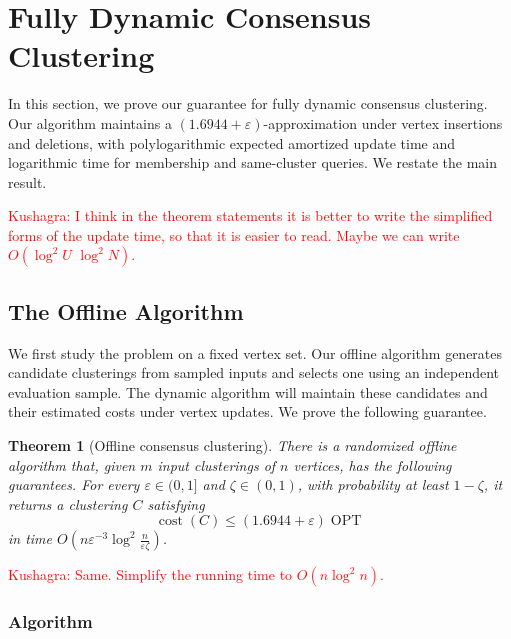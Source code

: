 \documentclass[11pt]{article}
\newtheorem{theorem}{Theorem}[section]
\theoremstyle{definition}
\theoremstyle{remark}
\newcommand{\1}{\mathbf{1}}
\newcommand{\kushagra}[1]{\textcolor{red}{\newline Kushagra: #1}}
\begin{document}
\section{Fully Dynamic Consensus Clustering}
\label{sec:dynamic}
In this section, we prove our guarantee for fully dynamic
consensus clustering. Our algorithm maintains a
$(1.6944+\varepsilon)$-approximation under vertex insertions
and deletions, with polylogarithmic expected amortized
update time and logarithmic time for membership and
same-cluster queries. We restate the main result. 

\ImplicitDynamic*

\kushagra{I think in the theorem statements it is better to write the simplified forms of the update time, so that it is easier to read. Maybe we can write $O(\log^2 U \, \, \log^2 N)$.}



\subsection{The Offline Algorithm}
\label{subsec:offline}
We first study the problem on a fixed vertex set.
Our offline algorithm generates candidate clusterings from
sampled inputs and selects one using an independent
evaluation sample. The dynamic algorithm will maintain
these candidates and their estimated costs under vertex
updates. We prove the following guarantee.

\begin{theorem}[Offline consensus clustering]
\label{thm:offline}
There is a randomized offline algorithm that, given
$m$ input clusterings of $n$ vertices, has the following
guarantees. For every $\varepsilon\in(0,1]$ and
$\zeta\in(0,1)$, with probability at least $1-\zeta$,
it returns a clustering $C$ satisfying
\[
    \operatorname{cost}(C)
        \le (1.6944+\varepsilon)\operatorname{OPT}
\]
in time $O\left(
        n\varepsilon^{-3}
        \log^2\frac{n}{\varepsilon\zeta}
    \right)$.
\end{theorem}

\kushagra{Same. Simplify the running time to $O(n \log^2 n).$}

\subsubsection{Algorithm}
\label{subsec:offline-overview}
\label{subsec:offline-buckets}
\end{document}
